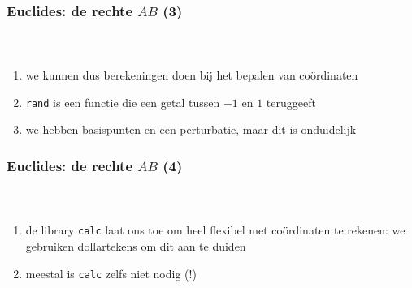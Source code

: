 \documentclass[]{beamer}
\begin{document}
\begin{frame}
  \frametitle{Euclides: de rechte $AB$ (3)}

  \begin{columns}
    \begin{column}{.67\textwidth}
      \inputminted[fontsize = \scriptsize]{latex}{tikz/triangle/1c.tikz}
    \end{column}
    \begin{column}{.33\textwidth}
      
    \end{column}
  \end{columns}

  \begin{enumerate}
    \item we kunnen dus berekeningen doen bij het bepalen van co\"ordinaten
    \item \texttt{rand} is een functie die een getal tussen $-1$ en $1$ teruggeeft
    \item\pause we hebben basispunten en een perturbatie, maar dit is onduidelijk
  \end{enumerate}
\end{frame}

\begin{frame}
  \frametitle{Euclides: de rechte $AB$ (4)}

  \begin{columns}
    \begin{column}{.67\textwidth}
      \inputminted[fontsize = \scriptsize]{latex}{tikz/triangle/1d.tikz}
    \end{column}
    \begin{column}{.33\textwidth}
      
    \end{column}
  \end{columns}

  \begin{enumerate}
    \item de library \texttt{calc} laat ons toe om heel flexibel met co\"ordinaten te rekenen: we gebruiken dollartekens om dit aan te duiden
    \item meestal is \texttt{calc} zelfs niet nodig (!)
  \end{enumerate}
\end{frame}
\end{document}
